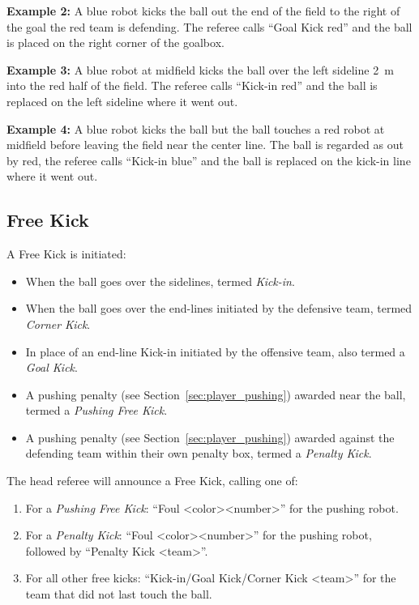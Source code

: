   \textbf{Example 2:} A blue robot kicks the ball out the end of the field to the right of the goal the red team is defending. The referee calls ``Goal Kick red'' and the ball is placed on the right corner of the goalbox.

  \textbf{Example 3:} A blue robot at midfield kicks the ball over the left sideline \qty{2}{\metre} into the red half of the field. The referee calls ``Kick-in red'' and the ball is replaced on the left sideline where it went out.

  \textbf{Example 4:} A blue robot kicks the ball but the ball touches a red robot at midfield before leaving the field near the center line. The ball is regarded as out by red, the referee calls ``Kick-in blue'' and the ball is replaced on the kick-in line where it went out.

\subsection{Free Kick}
\label{sec:free_kick}

A Free Kick is initiated:
\begin{itemize}
  \item When the ball goes over the sidelines, termed \emph{Kick-in}.
  \item When the ball goes over the end-lines initiated by the defensive team, termed \emph{Corner Kick}.
  \item In place of an end-line Kick-in initiated by the offensive team, also termed a \emph{Goal Kick}.
  \item A pushing penalty (see Section~\ref{sec:player_pushing}) awarded near the ball, termed a \emph{Pushing Free Kick}.
  \item A pushing penalty (see Section~\ref{sec:player_pushing}) awarded against the defending team within their own penalty box, termed a \textit{Penalty Kick}.
\end{itemize}

The head referee will announce a Free Kick, calling one of:
\begin{enumerate}
  \item For a \textit{Pushing Free Kick}: ``Foul \textless color\textgreater \textless number\textgreater'' for the pushing robot.
  \item For a \textit{Penalty Kick}: ``Foul \textless color\textgreater \textless number\textgreater'' for the pushing robot, followed by ``Penalty Kick \textless team\textgreater''.
  \item For all other free kicks: ``Kick-in/Goal Kick/Corner Kick \textless team\textgreater'' for the team that did not last touch the ball.
\end{enumerate}

